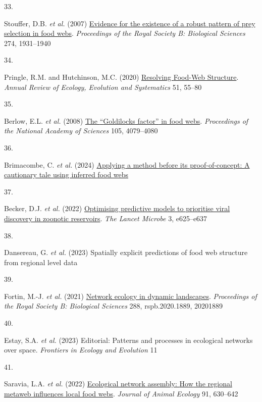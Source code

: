 \documentclass[
]{article}
\newlength{\cslhangindent}
\newlength{\csllabelwidth}
\newenvironment{CSLReferences}[2] %
 {\begin{list}{}{%
  \setlength{\itemindent}{0pt}
  \setlength{\leftmargin}{0pt}
  \setlength{\parsep}{0pt}
  \ifodd #1
   \setlength{\leftmargin}{\cslhangindent}
   \setlength{\itemindent}{-1\cslhangindent}
  \fi
  \setlength{\itemsep}{#2\baselineskip}}}
 {\end{list}}
\newcommand{\CSLLeftMargin}[1]{\parbox[t]{\csllabelwidth}{\strut#1\strut}}
\newcommand{\CSLRightInline}[1]{\parbox[t]{\linewidth - \csllabelwidth}{\strut#1\strut}}
\begin{document}
\begin{CSLReferences}{0}{0}
\CSLLeftMargin{33. }%
\CSLRightInline{Stouffer, D.B. \emph{et al.} (2007)
\href{https://doi.org/10.1098/rspb.2007.0571}{Evidence for the existence
of a robust pattern of prey selection in food webs}. \emph{Proceedings
of the Royal Society B: Biological Sciences} 274, 1931--1940}

\CSLLeftMargin{34. }%
\CSLRightInline{Pringle, R.M. and Hutchinson, M.C. (2020)
\href{https://doi.org/10.1146/annurev-ecolsys-110218-024908}{Resolving
{Food-Web Structure}}. \emph{Annual Review of Ecology, Evolution and
Systematics} 51, 55--80}

\CSLLeftMargin{35. }%
\CSLRightInline{Berlow, E.L. \emph{et al.} (2008)
\href{https://doi.org/10.1073/pnas.0800967105}{The {``{Goldilocks}
factor''} in food webs}. \emph{Proceedings of the National Academy of
Sciences} 105, 4079--4080}

\CSLLeftMargin{36. }%
\CSLRightInline{Brimacombe, C. \emph{et al.} (2024)
\href{https://doi.org/10.13140/RG.2.2.22076.65927}{Applying a method
before its proof-of-concept: {A} cautionary tale using inferred food
webs}}

\CSLLeftMargin{37. }%
\CSLRightInline{Becker, D.J. \emph{et al.} (2022)
\href{https://doi.org/10.1016/S2666-5247(21)00245-7}{Optimising
predictive models to prioritise viral discovery in zoonotic reservoirs}.
\emph{The Lancet Microbe} 3, e625--e637}

\CSLLeftMargin{38. }%
\CSLRightInline{Dansereau, G. \emph{et al.} (2023) Spatially explicit
predictions of food web structure from regional level data}

\CSLLeftMargin{39. }%
\CSLRightInline{Fortin, M.-J. \emph{et al.} (2021)
\href{https://doi.org/10.1098/rspb.2020.1889}{Network ecology in dynamic
landscapes}. \emph{Proceedings of the Royal Society B: Biological
Sciences} 288, rspb.2020.1889, 20201889}

\CSLLeftMargin{40. }%
\CSLRightInline{Estay, S.A. \emph{et al.} (2023) Editorial: {Patterns}
and processes in ecological networks over space. \emph{Frontiers in
Ecology and Evolution} 11}

\CSLLeftMargin{41. }%
\CSLRightInline{Saravia, L.A. \emph{et al.} (2022)
\href{https://doi.org/10.1111/1365-2656.13652}{Ecological network
assembly: {How} the regional metaweb influences local food webs}.
\emph{Journal of Animal Ecology} 91, 630--642}

\end{CSLReferences}
\end{document}
